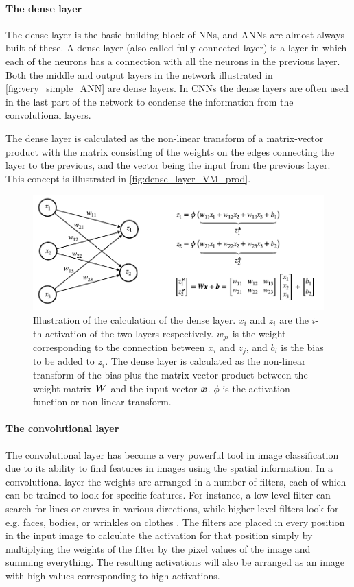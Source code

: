 \paragraph{The dense layer}
The dense layer is the basic building block of NNs, and ANNs are almost always built of these. A dense layer (also called fully-connected layer) is a layer in which each of the neurons has a connection with all the neurons in the previous layer. Both the middle and output layers in the network illustrated in \autoref{fig:very_simple_ANN} are dense layers. In CNNs the dense layers are often used in the last part of the network to condense the information from the convolutional layers.

The dense layer is calculated as the non-linear transform of a matrix-vector product with the matrix consisting of the weights on the edges connecting the layer to the previous, and the vector being the input from the previous layer. This concept is illustrated in \autoref{fig:dense_layer_VM_prod}.
\begin{figure}
    \centering
    \captionsetup{width=.95\linewidth}
    \includegraphics[width=\linewidth]{Pics/02_Theory/dense_layer_VM_prod.png}
    \caption{Illustration of the calculation of the dense layer. $x_i$ and $z_i$ are the $i$-th activation of the two layers respectively. $w_{ji}$ is the weight corresponding to the connection between $x_i$ and $z_j$, and $b_i$ is the bias to be added to $z_i$. The dense layer is calculated as the non-linear transform of the bias plus the matrix-vector product between the weight matrix $\boldsymbol{W}$ and the input vector $\boldsymbol{x}$. $\phi$ is the activation function or non-linear transform.}
    \label{fig:dense_layer_VM_prod}
\end{figure}

\paragraph{The convolutional layer}
The convolutional layer has become a very powerful tool in image classification due to its ability to find features in images using the spatial information. In a convolutional layer the weights are arranged in a number of filters, each of which can be trained to look for specific features. For instance, a low-level filter can search for lines or curves in various directions, while higher-level filters look for e.g. faces, bodies, or wrinkles on clothes \cite{Yosinski2015}. The filters are placed in every position in the input image to calculate the activation for that position simply by multiplying the weights of the filter by the pixel values of the image and summing everything. The resulting activations will also be arranged as an image with high values corresponding to high activations.

